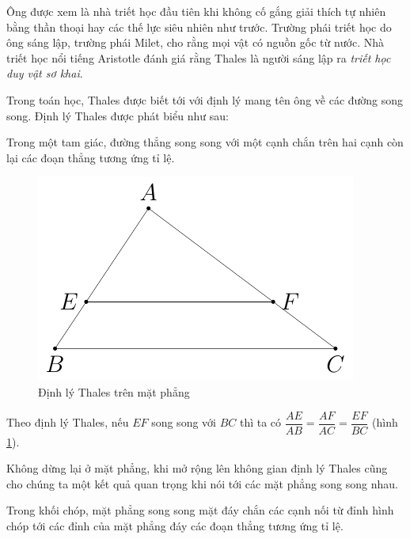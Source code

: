 Ông được xem là nhà triết học đầu tiên khi không cố gắng giải thích tự nhiên bằng thần thoại hay các thế lực siêu nhiên như trước. Trường phái triết học do ông sáng lập, trường phái Milet, cho rằng mọi vật có nguồn gốc từ nước. Nhà triết học nổi tiếng Aristotle đánh giá rằng Thales là người sáng lập ra \textit{triết học duy vật sơ khai}.

Trong toán học, Thales được biết tới với định lý mang tên ông về các đường song song. Định lý Thales được phát biểu như sau:

\begin{theorem}
    Trong một tam giác, đường thẳng song song với một cạnh chắn trên hai cạnh còn lại các đoạn thẳng tương ứng tỉ lệ.
\end{theorem}

\begin{figure}[ht]
	\centering
	\includegraphics{analytic_geometry/thales1.pdf}
	\caption{Định lý Thales trên mặt phẳng}
	\label{thales1}
\end{figure}

Theo định lý Thales, nếu $EF$ song song với $BC$ thì ta có $\dfrac{AE}{AB} = \dfrac{AF}{AC} = \dfrac{EF}{BC}$ (hình \ref{thales1}).

Không dừng lại ở mặt phẳng, khi mở rộng lên không gian định lý Thales cũng cho chúng ta một kết quả quan trọng khi nói tới các mặt phẳng song song nhau.

\begin{theorem}
    Trong khối chóp, mặt phẳng song song mặt đáy chắn các cạnh nối từ đỉnh hình chóp tới các đỉnh của mặt phẳng đáy các đoạn thẳng tương ứng tỉ lệ.
\end{theorem}

